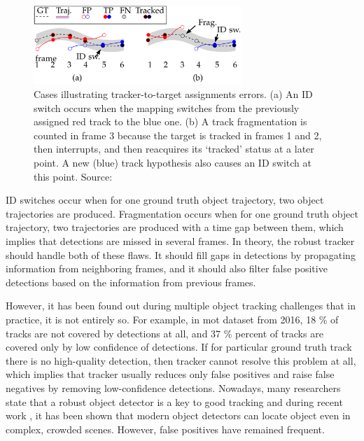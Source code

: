 \begin{introduction}
        \begin{figure}[ht]
          \centering
          \includegraphics[width=0.7\textwidth]{resources/tracking_errors.png}
          \caption{Cases illustrating tracker-to-target assignments errors. (a) An ID switch occurs when the mapping switches from the previously assigned red track to the blue one. (b) A track fragmentation is counted in frame 3 because the target is tracked in frames 1 and 2, then interrupts, and then reacquires its ‘tracked’ status at a later point. A new (blue) track hypothesis also causes an ID switch at this point. Source: \cite{MOTChallenge2015}}
          \label{fig:id switch example}
        \end{figure}
        
        ID switches occur when for one ground truth object trajectory, two object trajectories are produced. Fragmentation occurs when for one ground truth object trajectory, two trajectories are produced with a time gap between them, which implies that detections are missed in several frames. In theory, the robust tracker should handle both of these flaws. It should fill gaps in detections by propagating information from neighboring frames, and it should also filter false positive detections based on the information from previous frames. 
        
        However, it has been found out during multiple object tracking challenges that in practice, it is not entirely so. For example, in \gls{mot} \cite{mot16} dataset from 2016, 18 \% of tracks are not covered by detections at all, and 37 \% percent of tracks are covered only by low confidence of detections. If for particular ground truth track there is no high-quality detection, then tracker cannot resolve this problem at all, which implies that tracker usually reduces only false positives and raise false negatives by removing low-confidence detections. Nowadays, many researchers state that a robust object detector is a key to good tracking \cite{mot16, konushin2017, bewley2016simple} and during recent work \cite{luo2014multiple, fan2016survey}, it has been shown that modern object detectors can locate object even in complex, crowded scenes. However, false positives have remained frequent. 
        

\end{introduction}
